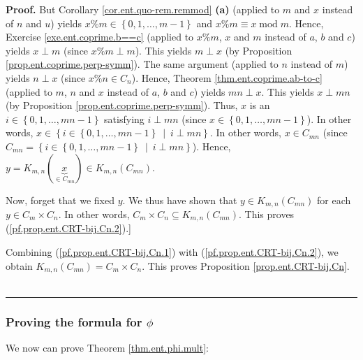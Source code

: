 \documentclass[numbers=enddot,12pt,final,onecolumn,notitlepage]{scrartcl}%
\numberwithin{exer}{subsection}
\theoremstyle{definition}
\newenvironment{proof}[1][Proof]{\noindent\textbf{#1.} }{\ \rule{0.5em}{0.5em}}
\begin{document}
\begin{proof}
But Corollary \ref{cor.ent.quo-rem.remmod} \textbf{(a)} (applied to $m$ and
$x$ instead of $n$ and $u$) yields $x\%m\in\left\{  0,1,\ldots,m-1\right\}  $
and $x\%m\equiv x\operatorname{mod}m$. Hence, Exercise
\ref{exe.ent.coprime.b==c} (applied to $x\%m$, $x$ and $m$ instead of $a$, $b$
and $c$) yields $x\perp m$ (since $x\%m\perp m$). This yields $m\perp x$ (by
Proposition \ref{prop.ent.coprime.perp-symm}). The same argument (applied to
$n$ instead of $m$) yields $n\perp x$ (since $x\%n\in C_{n}$). Hence, Theorem
\ref{thm.ent.coprime.ab-to-c} (applied to $m$, $n$ and $x$ instead of $a$, $b$
and $c$) yields $mn\perp x$. This yields $x\perp mn$ (by Proposition
\ref{prop.ent.coprime.perp-symm}). Thus, $x$ is an $i\in\left\{
0,1,\ldots,mn-1\right\}  $ satisfying $i\perp mn$ (since $x\in\left\{
0,1,\ldots,mn-1\right\}  $). In other words, $x\in\left\{  i\in\left\{
0,1,\ldots,mn-1\right\}  \ \mid\ i\perp mn\right\}  $. In other words, $x\in
C_{mn}$ (since $C_{mn}=\left\{  i\in\left\{  0,1,\ldots,mn-1\right\}
\ \mid\ i\perp mn\right\}  $). Hence, $y=K_{m,n}\left(  \underbrace{x}_{\in
C_{mn}}\right)  \in K_{m,n}\left(  C_{mn}\right)  $.

Now, forget that we fixed $y$. We thus have shown that $y\in K_{m,n}\left(
C_{mn}\right)  $ for each $y\in C_{m}\times C_{n}$. In other words,
$C_{m}\times C_{n}\subseteq K_{m,n}\left(  C_{mn}\right)  $. This proves
(\ref{pf.prop.ent.CRT-bij.Cn.2}).]

Combining (\ref{pf.prop.ent.CRT-bij.Cn.1}) with
(\ref{pf.prop.ent.CRT-bij.Cn.2}), we obtain $K_{m,n}\left(  C_{mn}\right)
=C_{m}\times C_{n}$. This proves Proposition \ref{prop.ent.CRT-bij.Cn}.
\end{proof}

\subsubsection{\label{sect.ent.phi-fml-proof}Proving the formula for $\phi$}

We now can prove Theorem \ref{thm.ent.phi.mult}:
\end{document}
